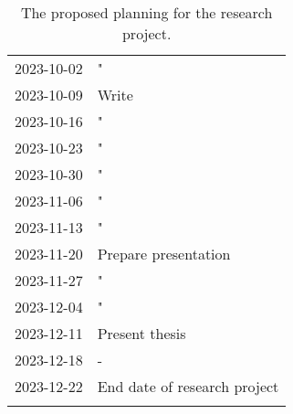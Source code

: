 \begin{longtable}{l l}
2023-10-02 & "                                                              \\
2023-10-09 & Write                                                                  \\
2023-10-16 & "                                                                  \\
2023-10-23 & "                                                                  \\
2023-10-30 & "                                                                  \\
2023-11-06 & "                                                                  \\
2023-11-13 & "                                                                  \\
2023-11-20 & Prepare presentation                                               \\
2023-11-27 & "                                                                  \\
2023-12-04 & "                                                                  \\
2023-12-11 & Present thesis                                                     \\
2023-12-18 & -                                                                  \\
2023-12-22 & End date of research project                                       \\
\caption{The proposed planning for the research project.}
\end{longtable}

